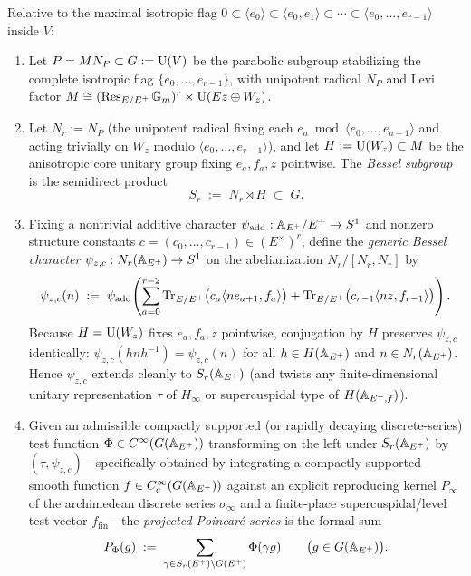 \begin{definition}
\label{def:15:bessel-poincare}
Relative to the maximal isotropic flag $0 \subset \langle e_0 \rangle \subset \langle e_0, e_1 \rangle \subset \cdots \subset \langle e_0, \dots, e_{r-1} \rangle$ inside $V$:
\begin{enumerate}[label=\textup{(\roman*)}]
\item Let $P = M N_P \subset G := \mathrm{U}(V)$ be the parabolic subgroup stabilizing the complete isotropic flag $\{e_0, \dots, e_{r-1}\}$, with unipotent radical $N_P$ and Levi factor $M \cong (\operatorname{Res}_{E/E^+}\mathbb{G}_m)^r \times \mathrm{U}(E z \oplus W_z)$.
\item Let $N_r := N_P$ (the unipotent radical fixing each $e_a \bmod \langle e_0, \dots, e_{a-1}\rangle$ and acting trivially on $W_z$ modulo $\langle e_0, \dots, e_{r-1}\rangle$), and let $H := \mathrm{U}(W_z) \subset M$ be the anisotropic core unitary group fixing $e_a, f_a, z$ pointwise. The \emph{Bessel subgroup} is the semidirect product
  \[
    S_r \;:=\; N_r \rtimes H \;\subset\; G.
  \]
\item Fixing a nontrivial additive character $\psi_{\mathrm{add}} : \mathbb{A}_{E^+} / E^+ \to S^1$ and nonzero structure constants $c = (c_0, \dots, c_{r-1}) \in (E^\times)^r$, define the \emph{generic Bessel character} $\psi_{z, c} : N_r(\mathbb{A}_{E^+}) \to S^1$ on the abelianization $N_r / [N_r, N_r]$ by
  \begin{equation}
  \label{eq:15:psi-gen}
    \psi_{z, c}(n) \;:=\; \psi_{\mathrm{add}}\!\left(\sum_{a = 0}^{r-2} \operatorname{Tr}_{E/E^+}\bigl(c_a \langle n e_{a+1}, f_a \rangle\bigr) + \operatorname{Tr}_{E/E^+}\bigl(c_{r-1} \langle n z, f_{r-1} \rangle\bigr)\right).
  \end{equation}
  Because $H = \mathrm{U}(W_z)$ fixes $e_a, f_a, z$ pointwise, conjugation by $H$ preserves $\psi_{z, c}$ identically: $\psi_{z, c}(h n h^{-1}) = \psi_{z, c}(n)$ for all $h \in H(\mathbb{A}_{E^+})$ and $n \in N_r(\mathbb{A}_{E^+})$. Hence $\psi_{z, c}$ extends cleanly to $S_r(\mathbb{A}_{E^+})$ (and twists any finite-dimensional unitary representation $\tau$ of $H_\infty$ or supercuspidal type of $H(\mathbb{A}_{E^+, f})$).
\item Given an admissible compactly supported (or rapidly decaying discrete-series) test function $\Phi \in C^\infty(G(\mathbb{A}_{E^+}))$ transforming on the left under $S_r(\mathbb{A}_{E^+})$ by $(\tau, \psi_{z, c})$—specifically obtained by integrating a compactly supported smooth function $f \in C_c^\infty(G(\mathbb{A}_{E^+}))$ against an explicit reproducing kernel $P_\infty$ of the archimedean discrete series $\sigma_\infty$ and a finite-place supercuspidal/level test vector $f_{\mathrm{fin}}$—the \emph{projected Poincar\'e series} is the formal sum
  \begin{equation}
  \label{eq:15:poincare-def}
    P_\Phi(g) \;:=\; \sum_{\gamma \in S_r(E^+) \backslash G(E^+)} \Phi(\gamma g)
    \qquad \bigl(g \in G(\mathbb{A}_{E^+})\bigr).
  \end{equation}
\end{enumerate}
\end{definition}

